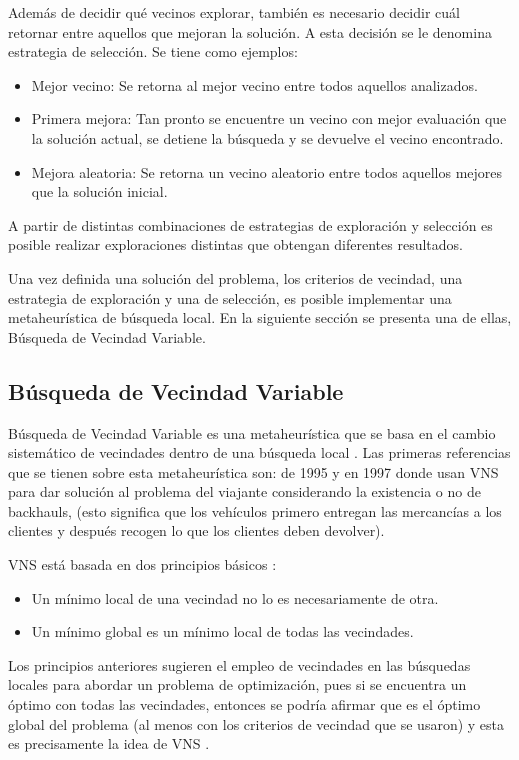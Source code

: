 Además de decidir qué vecinos explorar, también es necesario decidir cuál retornar entre aquellos que mejoran la solución. A esta decisión se le denomina estrategia de selección. Se tiene como ejemplos:

\begin{itemize}
	\item Mejor vecino: Se retorna al mejor vecino entre todos aquellos analizados.
	\item Primera mejora: Tan pronto se encuentre un vecino con mejor evaluación que la solución actual, se detiene la búsqueda y se devuelve el vecino encontrado.
	\item Mejora aleatoria: Se retorna un vecino aleatorio entre todos aquellos mejores que la solución inicial.
\end{itemize}

A partir de distintas combinaciones de estrategias de exploración y selección es posible realizar exploraciones distintas que obtengan diferentes resultados.

Una vez definida una solución del problema, los criterios de vecindad, una estrategia de exploración y una de selección, es posible implementar una metaheurística de búsqueda local. En la siguiente sección se presenta una de ellas, Búsqueda de Vecindad Variable.

\subsection{Búsqueda de Vecindad Variable} \label{1-vns}

Búsqueda de Vecindad Variable es una metaheurística que se basa en el cambio sistemático de vecindades dentro de una búsqueda local \cite{TODO}. Las primeras referencias que se tienen sobre esta metaheurística son: \cite{TODO} de 1995 y \cite{TODO} en 1997 donde usan VNS para dar solución al problema del viajante considerando la existencia o no de backhauls, (esto significa que los vehículos primero entregan las mercancías a los clientes y después recogen lo que los clientes deben devolver).

VNS está basada en dos principios básicos \cite{Camila}:
\begin{itemize}
	\item Un mínimo local de una vecindad no lo es necesariamente de otra.
	\item Un mínimo global es un mínimo local de todas las vecindades.
\end{itemize}

Los principios anteriores sugieren el empleo de vecindades en las búsquedas locales para abordar un problema de optimización, pues si se encuentra un óptimo con todas las vecindades, entonces se podría afirmar que es el óptimo global del problema (al menos con los criterios de vecindad que se usaron) y esta es precisamente la idea de VNS \cite{Camila}.

